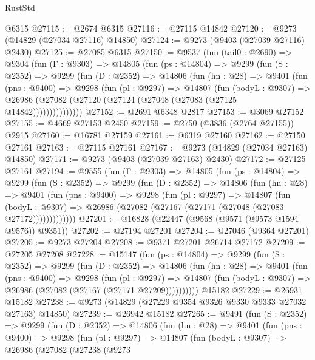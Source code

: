 \begin{lexlean}{RustStd}
\begin{coremodule}
{\begin{coremodule}
{{{{{{{{{{{{{{{{{{{{{{{{{{{{{{{{{{{{{{{{{{{{{{{{{{{{{{{    @6315
@27115 := @2674 @6315
@27116 := @27115 @14842
@27120 := @9273 (@14829 (@27034 @27116) @14850)
@27124 := @9273 (@9403 (@27039 @27116) @2430)
@27125 := @27085 @6315
@27150 := @9537
    (fun (tail0 : @2690) =>
    @9304
      (fun (Γ : @9303) =>
      @14805
        (fun (ps : @14804) =>
        @9299
          (fun (S : @2352) =>
          @9299
            (fun (D : @2352) =>
            @14806
              (fun (hn : @28) =>
              @9401
                (fun (pns : @9400) =>
                @9298
                  (fun (pl : @9297) =>
                  @14807
                    (fun (bodyL : @9307) =>
                    @26986 (@27082 (@27120 (@27124 (@27048 (@27083 (@27125 @14842)))))))))))))))
@27152 := @2691 @6348 @2817
@27153 := @3069 @27152
@27155 := @4669 @27153 @2450
@27159 := @2750 (@3836 (@2764 @27155)) @2915
@27160 := @16781 @27159
@27161 := @6319 @27160
@27162 := @27150 @27161
@27163 := @27115 @27161
@27167 := @9273 (@14829 (@27034 @27163) @14850)
@27171 := @9273 (@9403 (@27039 @27163) @2430)
@27172 := @27125 @27161
@27194 := @9555
    (fun (Γ : @9303) =>
    @14805
      (fun (ps : @14804) =>
      @9299
        (fun (S : @2352) =>
        @9299
          (fun (D : @2352) =>
          @14806
            (fun (hn : @28) =>
            @9401
              (fun (pns : @9400) =>
              @9298
                (fun (pl : @9297) =>
                @14807
                  (fun (bodyL : @9307) =>
                  @26986 (@27082 (@27167 (@27171 (@27048 (@27083 @27172)))))))))))))
@27201 := @16828 (@22447 (@9568 (@9571 (@9573 @1594 @9576)) @9351))
@27202 := @27194 @27201
@27204 := @27046 (@9364 @27201)
@27205 := @9273 @27204
@27208 := @9371 @27201 @26714 @27172
@27209 := @27205 @27208
@27228 := @15147
    (fun (ps : @14804) =>
    @9299
      (fun (S : @2352) =>
      @9299
        (fun (D : @2352) =>
        @14806
          (fun (hn : @28) =>
          @9401
            (fun (pns : @9400) =>
            @9298
              (fun (pl : @9297) =>
              @14807 (fun (bodyL : @9307) => @26986 (@27082 (@27167 (@27171 @27209))))))))))
    @15182
@27229 := @26931 @15182
@27238 := @9273 (@14829 (@27229 @9354 @9326 @9330 @9333 @27032 @27163) @14850)
@27239 := @26942 @15182
@27265 := @9491
    (fun (S : @2352) =>
    @9299
      (fun (D : @2352) =>
      @14806
        (fun (hn : @28) =>
        @9401
          (fun (pns : @9400) =>
          @9298
            (fun (pl : @9297) =>
            @14807
              (fun (bodyL : @9307) =>
              @26986
                (@27082
                  (@27238
                    (@9273
}}}}}}}}}}}}}}}}}}}}}}}}}}}}}}}}}}}}}}}}}}}}}}}}}}}}}}}
\end{coremodule}}
\end{coremodule}
\end{lexlean}
